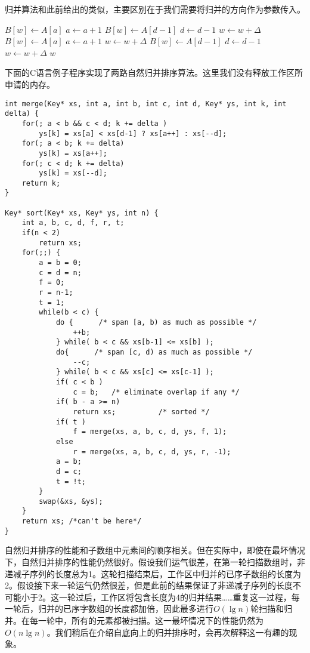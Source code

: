 \documentclass[UTF8]{article}
\begin{document}
归并算法和此前给出的类似，主要区别在于我们需要将归并的方向作为参数传入。

\begin{algorithmic}[1]
\Function{Merge}{$A, [a, b), [c, d), B, w, \Delta$}
      \State $B[w] \gets A[a]$
      \State $a \gets a + 1$
    \Else
      \State $B[w] \gets A[d-1]$
      \State $d \gets d - 1$
    \EndIf
    \State $w \gets w + \Delta$
  \EndWhile
    \State $B[w] \gets A[a]$
    \State $a \gets a + 1$
    \State $w \gets w + \Delta$
  \EndWhile
    \State $B[w] \gets A[d-1]$
    \State $d \gets d - 1$
    \State $w \gets w + \Delta$
  \EndWhile
  \State \Return $w$
\EndFunction
\end{algorithmic}

下面的C语言例子程序实现了两路自然归并排序算法。这里我们没有释放工作区所申请的内存。

\lstset{language=C}
\begin{lstlisting}
int merge(Key* xs, int a, int b, int c, int d, Key* ys, int k, int delta) {
    for(; a < b && c < d; k += delta )
        ys[k] = xs[a] < xs[d-1] ? xs[a++] : xs[--d];
    for(; a < b; k += delta)
        ys[k] = xs[a++];
    for(; c < d; k += delta)
        ys[k] = xs[--d];
    return k;
}

Key* sort(Key* xs, Key* ys, int n) {
    int a, b, c, d, f, r, t;
    if(n < 2)
        return xs;
    for(;;) {
        a = b = 0;
        c = d = n;
        f = 0;
        r = n-1;
        t = 1;
        while(b < c) {
            do {      /* span [a, b) as much as possible */
                ++b;
            } while( b < c && xs[b-1] <= xs[b] );
            do{      /* span [c, d) as much as possible */
                --c;
            } while( b < c && xs[c] <= xs[c-1] );
            if( c < b )
                c = b;   /* eliminate overlap if any */
            if( b - a >= n)
                return xs;          /* sorted */
            if( t )
                f = merge(xs, a, b, c, d, ys, f, 1);
            else
                r = merge(xs, a, b, c, d, ys, r, -1);
            a = b;
            d = c;
            t = !t;
        }
        swap(&xs, &ys);
    }
    return xs; /*can't be here*/
}
\end{lstlisting}

自然归并排序的性能和子数组中元素间的顺序相关。但在实际中，即使在最坏情况下，自然归并排序的性能仍然很好。假设我们运气很差，在第一轮扫描数组时，非递减子序列的长度总为1。这轮扫描结束后，工作区中归并的已序子数组的长度为2。假设接下来一轮运气仍然很差，但是此前的结果保证了非递减子序列的长度不可能小于2。这一轮过后，工作区将包含长度为4的归并结果……重复这一过程，每一轮后，归并的已序字数组的长度都加倍，因此最多进行$O(\lg n)$轮扫描和归并。在每一轮中，所有的元素都被扫描。这一最坏情况下的性能仍然为$O(n \lg n)$。我们稍后在介绍自底向上的归并排序时，会再次解释这一有趣的现象。
\end{document}
